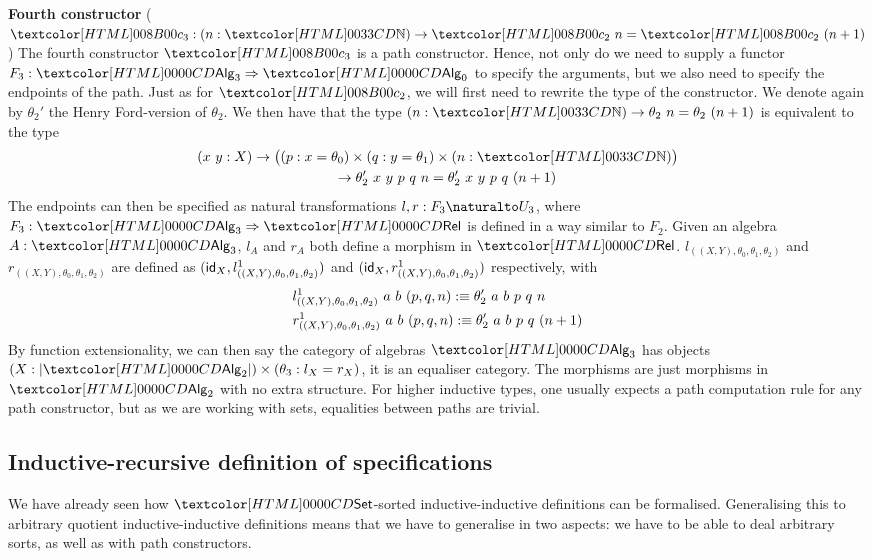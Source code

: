 {\bf Fourth constructor}
($\Bciii : (n : \natty) \to \Bcii\ n = \Bcii\ (n+1)$) The fourth
constructor $\Bciii$ is a path constructor. Hence, not only do we need
to supply a functor $F_3 : \Func{\Alg_3}{\Alg_0}$ to specify the
arguments, but we also need to specify the endpoints of the path. Just
as for $\Bcii$, we will first need to rewrite the type of the
constructor. We denote again by $\theta_2'$ the Henry Ford-version of
$\theta_2$.  We then have that the type
$(n : \natty) \to \theta_2\ n = \theta_2\ (n+ 1)$ is equivalent to the
type
%
\begin{multline*}
(x\ y : X) \to \big((p : x =  \theta_0) \times (q : y = \theta_1) \times (n : \natty)\big) \\
\ \ \ \ \to \theta_2'\ x\ y\ p\ q\ n = \theta_2'\ x\ y\ p\ q\ (n+1)
\end{multline*}
%
The endpoints can then be specified as natural transformations
$l, r : \Nat{F_3}{U_3}$, where $F_3 : \Func{\Alg_3}{\Rel}$ is defined in a
way similar to $F_2$. Given an algebra $A : \Alg_3$, $l_A$ and $r_A$
both define a morphism in
$\Rel$. $l_{((X,Y),\theta_0,\theta_1,\theta_2)}$ and
$r_{((X,Y),\theta_0,\theta_1,\theta_2)}$ are defined as
$(\mathsf{id}_X, l^1_{((X,Y),\theta_0,\theta_1,\theta_2)})$ and
$(\mathsf{id}_X,r^1_{((X,Y),\theta_0,\theta_1,\theta_2)})$ respectively, with
%
\begin{align*}
&l^1_{((X,Y),\theta_0,\theta_1,\theta_2)}\ a\ b\ (p, q, n) :\equiv \theta_2'\ a\ b\ p\ q\ n \\
&r^1_{((X,Y),\theta_0,\theta_1,\theta_2)}\ a\ b\ (p, q, n) :\equiv \theta_2'\ a\ b\ p\ q\ (n+1)
\end{align*}
%
By function extensionality, we can then say the category of algebras
$\Alg_3$ has objects $(X : | \Alg_2 |) \times (\theta_3 : l_X = r_X)$,
\ie it is an equaliser category. The morphisms are just morphisms in
$\Alg_2$ with no extra structure. For higher inductive types, one
usually expects a path computation rule for any path constructor, but
as we are working with sets, equalities between paths are trivial.

\subsection{Inductive-recursive definition of specifications}

We have already seen how $\Set$-sorted inductive-inductive definitions
can be formalised. Generalising this to arbitrary quotient
inductive-inductive definitions means that we have to generalise in
two aspects: we have to be able to deal arbitrary sorts, as well as
with path constructors.

